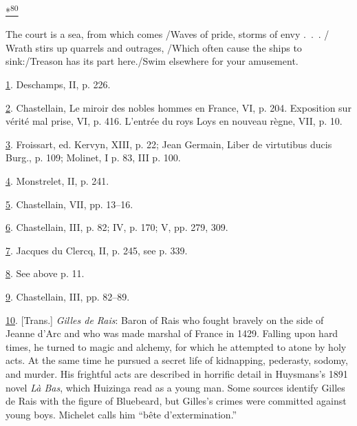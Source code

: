 \protect\hypertarget{23_NOTES.xhtmlux5cux23id_3100}{\protect\hyperlink{10_Chapter_Three__THE_HEROIC_DREAM.xhtmlux5cux23id_3099}{*\textsuperscript{80}}}
The court is a sea, from which comes /Waves of pride, storms of envy
.~.~. / Wrath stirs up quarrels and outrages, /Which often cause the
ships to sink:/Treason has its part here./Swim elsewhere for your
amusement.

\protect\hypertarget{23_NOTES.xhtmlux5cux23id_1930}{\protect\hyperlink{10_Chapter_Three__THE_HEROIC_DREAM.xhtmlux5cux23id_1929}{1}}.
Deschamps, II, p. 226.

\protect\hypertarget{23_NOTES.xhtmlux5cux23id_1928}{\protect\hyperlink{10_Chapter_Three__THE_HEROIC_DREAM.xhtmlux5cux23id_1927}{2}}.
Chastellain, Le miroir des nobles hommes en France, VI, p. 204.
Exposition sur vérité mal prise, VI, p. 416. L'entrée du roys Loys en
nouveau règne, VII, p. 10.

\protect\hypertarget{23_NOTES.xhtmlux5cux23id_1926}{\protect\hyperlink{10_Chapter_Three__THE_HEROIC_DREAM.xhtmlux5cux23id_1925}{3}}.
Froissart, ed. Kervyn, XIII, p. 22; Jean Germain, Liber de virtutibus
ducis Burg., p. 109; Molinet, I p. 83, III p. 100.

\protect\hypertarget{23_NOTES.xhtmlux5cux23id_1924}{\protect\hyperlink{10_Chapter_Three__THE_HEROIC_DREAM.xhtmlux5cux23id_1923}{4}}.
Monstrelet, II, p. 241.

\protect\hypertarget{23_NOTES.xhtmlux5cux23id_1922}{\protect\hyperlink{10_Chapter_Three__THE_HEROIC_DREAM.xhtmlux5cux23id_1921}{5}}.
Chastellain, VII, pp. 13--16.

\protect\hypertarget{23_NOTES.xhtmlux5cux23id_1920}{\protect\hyperlink{10_Chapter_Three__THE_HEROIC_DREAM.xhtmlux5cux23id_1919}{6}}.
Chastellain, III, p. 82; IV, p. 170; V, pp. 279, 309.

\protect\hypertarget{23_NOTES.xhtmlux5cux23id_1918}{\protect\hyperlink{10_Chapter_Three__THE_HEROIC_DREAM.xhtmlux5cux23id_1917}{7}}.
Jacques du Clercq, II, p. 245, see p. 339.

\protect\hypertarget{23_NOTES.xhtmlux5cux23id_1916}{\protect\hyperlink{10_Chapter_Three__THE_HEROIC_DREAM.xhtmlux5cux23id_1915}{8}}.
See above p. 11.

\protect\hypertarget{23_NOTES.xhtmlux5cux23id_1914}{\protect\hyperlink{10_Chapter_Three__THE_HEROIC_DREAM.xhtmlux5cux23id_1913}{9}}.
Chastellain, III, pp. 82--89.

\protect\hypertarget{23_NOTES.xhtmlux5cux23id_1912}{\protect\hyperlink{10_Chapter_Three__THE_HEROIC_DREAM.xhtmlux5cux23id_1911}{10}}.
{[}Trans.{]} \emph{Gilles de Rais}: Baron of Rais who fought bravely on
the side of Jeanne d'Arc and who was made marshal of France in 1429.
Falling upon hard times, he turned to magic and alchemy, for which he
attempted to atone by holy acts. At the same time he pursued a secret
life of kidnapping, pederasty, sodomy, and murder. His frightful acts
are described in horrific detail in Huysmans's 1891 novel \emph{Là Bas},
which Huizinga read as a young man. Some sources identify Gilles de Rais
with the figure of Bluebeard, but Gilles's crimes were committed against
young boys. Michelet calls him ``bête d'extermination.''

